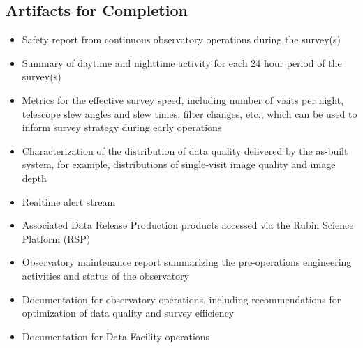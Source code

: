 

\subsection{Artifacts for Completion}

\begin{itemize}
\item Safety report from continuous observatory operations during the survey(s)
\item Summary of daytime and nighttime activity for each 24 hour period of the survey(s)
\item Metrics for the effective survey speed, including number of visits per night, telescope slew angles and slew times, filter changes, etc., which can be used to inform survey strategy during early operations
\item Characterization of the distribution of data quality delivered by the as-built system, for example, distributions of single-visit image quality and image depth
\item Realtime alert stream
\item Associated Data Release Production products accessed via the Rubin Science Platform (RSP)
\item Observatory maintenance report summarizing the pre-operations engineering activities and status of the observatory
\item Documentation for observatory operations, including recommendations for optimization of data quality and survey efficiency
\item Documentation for Data Facility operations
\end{itemize}

